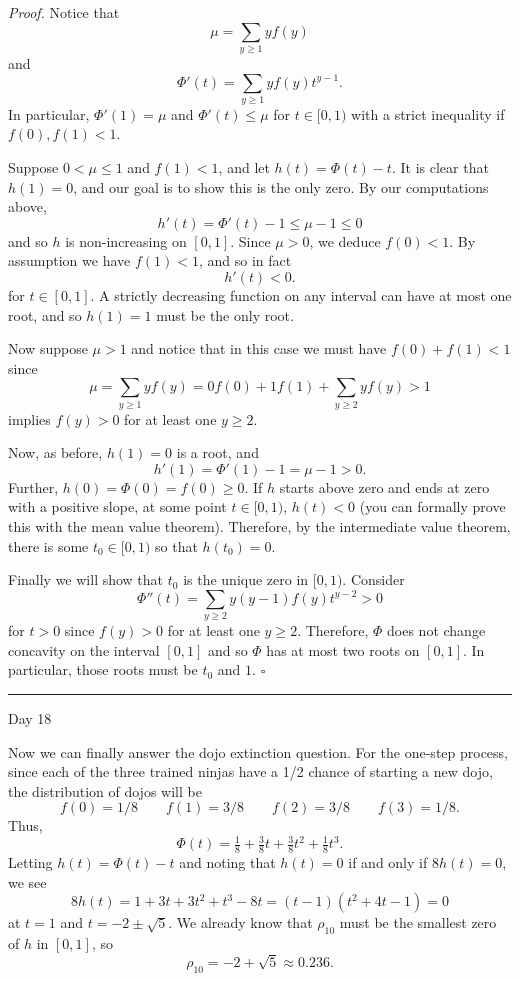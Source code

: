 \documentclass{problemset}
\newcommand{\1}{\mathbf{1}}
\newcommand{\fatrule}[1]{\vspace{.3cm}\hrule {\hfill \sf #1}\par}
\newenvironment{proof}{\emph{Proof.}}{\hfill$\square$}
\begin{document}
	\begin{proof}
		Notice that
		\[
			\mu = \sum_{y\geq 1} yf(y)
		\]
		and
		\[
			\Phi'(t) = \sum_{y\geq 1} yf(y) t^{y-1}.
		\]
		In particular, $\Phi'(1) =\mu$ and $\Phi'(t) \leq \mu$ for $t\in [0,1)$ with 
			a strict inequality if $f(0),f(1)<1$.

		Suppose $0<\mu\leq 1$ and $f(1) < 1$, and let $h(t) = \Phi(t)-t$.  It is clear that
		$h(1)=0$, and our goal is to show this is the only zero.  By our computations above,
		\[
			h'(t) = \Phi'(t) - 1\leq \mu-1 \leq 0
		\]
		and so $h$ is non-increasing on $[0,1]$.  Since $\mu >0$, we deduce $f(0)<1$.  By assumption
		we have $f(1) < 1$, and so in fact
		\[
			h'(t) < 0.
		\]
		for $t\in[0,1]$.  A strictly decreasing function on any interval can have at most one root,
		and so $h(1)=1$ must be the only root.

		Now suppose $\mu > 1$ and notice that in this case we must have $f(0)+f(1) < 1$ since
		\[
			\mu = \sum_{y\geq 1} yf(y) = 0f(0) +1f(1) + \sum_{y\geq 2} yf(y) > 1
		\]
		implies $f(y) > 0$ for at least one $y\geq 2$.

		Now, as before, $h(1)=0$ is a root, and 
		\[
			h'(1) = \Phi'(1) - 1=\mu-1 > 0.
		\]
		Further, $h(0)=\Phi(0) = f(0)\geq 0$.  If $h$ starts above zero
		and ends at zero with a positive slope, at some point $t\in[0,1)$,
			$h(t)<0$ (you can formally
			prove this with the mean value theorem).  
			Therefore, by the intermediate value theorem, there is some $t_0\in[0,1)$
				so that $h(t_0)=0$.

		Finally we will show that $t_0$ is the unique zero in $[0,1)$.  Consider
		\[
			\Phi''(t) = \sum_{y\geq 2} y(y-1)f(y)t^{y-2} > 0
		\]
		for $t>0$ since $f(y)>0$ for at least one $y\geq 2$.  Therefore, $\Phi$ does not
		change concavity on the interval $[0,1]$ and so $\Phi$ has at most two roots 
		on $[0,1]$.  In particular, those roots must be $t_0$ and $1$.
	\end{proof}

	\fatrule{Day 18}
	Now we can finally answer the dojo extinction question.  For the one-step process,
	since each of the three trained ninjas have a 1/2 chance of starting a new dojo, 
	the distribution of dojos will be
	\[
		f(0) = 1/8\qquad f(1)=3/8 \qquad f(2)=3/8 \qquad f(3) = 1/8.
	\]
	Thus, 
	\[
		\Phi(t) = \tfrac{1}{8} + \tfrac{3}{8}t + \tfrac{3}{8}t^2+\tfrac{1}{8}t^3.
	\]
	Letting $h(t) = \Phi(t)-t$ and noting that $h(t)=0$ if and only if $8h(t)=0$, 
	we see
	\[
		8h(t) = 1+3t+3t^2+t^3-8t = (t-1)(t^2+4t-1)=0
	\]
	at $t=1$ and $t=-2\pm \sqrt{5}$.  We already know that $\rho_{10}$ must be the smallest 
	zero of $h$ in $[0,1]$, so 
	\[
		\rho_{10} = -2+\sqrt{5} \approx 0.236.
	\]
\end{document}
